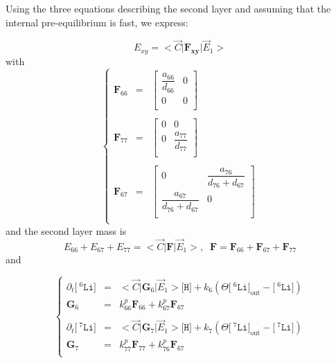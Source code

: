 \documentclass[aps,onecolumn,11pt]{revtex4}
\newcommand{\mychem}[1]{\mathtt{#1}}
\newcommand{\myconc}[1]{\big[#1\big]}
\newcommand{\spLi}[1]{{\!~^{#1}\mychem{Li}}}
\newcommand{\Li}[1]{\myconc{\spLi{#1}}}
\newcommand{\spproton}{\mychem{H}}
\newcommand{\proton}{\myconc{\spproton}}
\newcommand{\myout}[1]{{#1}_{\mathrm{out}}}
\newcommand{\LiOut}[1]{\myout{\Li{#1}}}
\newcommand{\mymat}[1]{{\bm{#1}}}
\begin{document}
Using the three equations describing the second layer and assuming that the internal pre-equilibrium is fast, we express:

\begin{equation}
\boxed{
E_{xy} = <{\vec{C}} \vert \mymat{F_{xy}} \vert \vec{E}_1 >
}
\end{equation}
with
\begin{equation}
\left\lbrace
\begin{array}{rcl}
\mymat{F}_{66} & = & 
\begin{bmatrix}
	\dfrac{a_{66}}{d_{66}} & 0 \\
	0 & 0\\
\end{bmatrix} \\
\\
\mymat{F}_{77} & = & 
\begin{bmatrix}
	0 & 0 \\
	0 & \dfrac{a_{77}}{d_{77}}\\
\end{bmatrix}  \\
\\
\mymat{F}_{67} & = & 
\begin{bmatrix}
	0 &\dfrac{a_{76}}{d_{76}+d_{67}}\\
	\dfrac{a_{67}}{d_{76}+d_{67}} & 0\\
\end{bmatrix} \\
\end{array}
\right.
\end{equation}
and the second layer mass is
\begin{equation}
E_{66} + E_{67} + E_{77} = <{\vec{C}} \vert \mymat{F} \vert \vec{E}_1 >, \;\;
 \mymat{F} 
 =  \mymat{F}_{66} + \mymat{F}_{67}  + \mymat{F}_{77} 
\end{equation}
and


\begin{equation}
\left\lbrace
\begin{array}{rcl}
	\partial_t \Li{6} & = & <\vec{C}|\mymat{G}_6|\vec{E}_1> \proton+ k_6\left(\Theta \LiOut{6} - \Li{6}\right)\\
	\mymat{G}_6 &= & k^p_{66} \mymat{F}_{66} + k^p_{67}\mymat{F}_{67} 
	\\
	\\
	\partial_t \Li{7} & = & <\vec{C}|\mymat{G}_7|\vec{E}_1> \proton + k_7\left(\Theta \LiOut{7} - \Li{7}\right)\\
	\mymat{G}_7 & = & k^p_{77} \mymat{F}_{77} + k^p_{76}\mymat{F}_{67} 
	\\
\end{array}
\right.
\end{equation}
\end{document}
